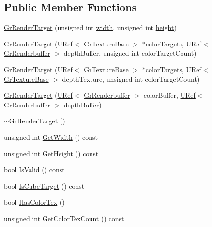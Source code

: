 \begin{CompactItemize}
\subsection*{Public Member Functions}
\begin{CompactItemize}
\item 
\hyperlink{class_gr_render_target_619b983e8beea92949165f6c906461d6}{GrRenderTarget} (unsigned int \hyperlink{wglext_8h_e6531b1788ca42a9ae8155b0c52e7630}{width}, unsigned int \hyperlink{wglext_8h_b2e63df950c3789599e1e43f477bc9e3}{height})
\item 
\hyperlink{class_gr_render_target_a2483dfaba49b2e626ea87fe05d24b38}{GrRenderTarget} (\hyperlink{class_u_ref}{URef}$<$ \hyperlink{class_gr_texture_base}{GrTextureBase} $>$ $\ast$colorTargets, \hyperlink{class_u_ref}{URef}$<$ \hyperlink{class_gr_renderbuffer}{GrRenderbuffer} $>$ depthBuffer, unsigned int colorTargetCount)
\item 
\hyperlink{class_gr_render_target_7025c93b7eedd75c73ef5956b3a815d0}{GrRenderTarget} (\hyperlink{class_u_ref}{URef}$<$ \hyperlink{class_gr_texture_base}{GrTextureBase} $>$ $\ast$colorTargets, \hyperlink{class_u_ref}{URef}$<$ \hyperlink{class_gr_texture_base}{GrTextureBase} $>$ depthTexture, unsigned int colorTargetCount)
\item 
\hyperlink{class_gr_render_target_bc4280eaa1d58bed60250fcbfda56557}{GrRenderTarget} (\hyperlink{class_u_ref}{URef}$<$ \hyperlink{class_gr_renderbuffer}{GrRenderbuffer} $>$ colorBuffer, \hyperlink{class_u_ref}{URef}$<$ \hyperlink{class_gr_renderbuffer}{GrRenderbuffer} $>$ depthBuffer)
\item 
\hyperlink{class_gr_render_target_734fdac5e2128109017b6d3d7abac6b5}{$\sim$GrRenderTarget} ()
\item 
unsigned int \hyperlink{class_gr_render_target_fd26d9d80f5311ee65fac1b2625d4fb0}{GetWidth} () const 
\item 
unsigned int \hyperlink{class_gr_render_target_e84bb1b12eaed6f272a8baeaf2fa2336}{GetHeight} () const 
\item 
bool \hyperlink{class_gr_render_target_1cc14b5ad9acc58a67d462844e8d65bc}{IsValid} () const 
\item 
bool \hyperlink{class_gr_render_target_63695c51fb0c525236ec9a749610f181}{IsCubeTarget} () const 
\item 
bool \hyperlink{class_gr_render_target_6466a4d09cef08dd33189714e271b53d}{HasColorTex} ()
\item 
unsigned int \hyperlink{class_gr_render_target_93fe155f4877c4361c5eb97f54826583}{GetColorTexCount} () const 

\end{CompactItemize}
\end{CompactItemize}
